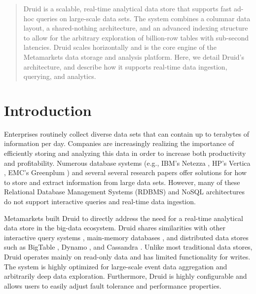 \documentclass{vldb}
\begin{document}
\maketitle

\begin{abstract}
Druid is a scalable, real-time analytical data store that supports
fast ad-hoc queries on large-scale data sets. The system combines a
columnar data layout, a shared-nothing architecture, and an advanced
indexing structure to allow for the arbitrary exploration of billion-row
tables with sub-second latencies. Druid scales horizontally and is the
core engine of the Metamarkets data storage and analysis platform. Here, we detail Druid's 
architecture, and describe how it supports real-time data ingestion, querying, and analytics. 
\end{abstract}

\section{Introduction}
Enterprises routinely collect diverse data sets that can contain up to terabytes of information per day. Companies are increasingly realizing the importance of efficiently storing and analyzing this data in order to increase both productivity and profitability. Numerous database systems (e.g., IBM’s Netezza \cite{singh2011introduction}, HP's Vertica \cite{bear2012vertica}, EMC’s Greenplum \cite{miner2012unified}) and several several research papers \cite{barroso2009datacenter, chaudhuri1997overview, dewitt1992parallel} offer solutions for how to store and extract information from large data sets. However, many of these Relational Database Management Systems (RDBMS) and NoSQL architectures do not support interactive queries and real-time data ingestion.

Metamarkets built Druid to directly address the need for a real-time analytical data store in the big-data ecosystem. Druid shares similarities with other interactive query systems \cite{melnik2010dremel}, main-memory databases \cite{farber2012sap}, and distributed data stores such as BigTable \cite{chang2008bigtable}, Dynamo \cite{decandia2007dynamo}, and Cassandra \cite{lakshman2010cassandra}. Unlike most traditional data stores, Druid operates mainly on read-only data and has limited functionality for writes. The system is highly optimized for large-scale event data aggregation and arbitrarily deep data exploration. Furthermore, Druid is highly configurable and allows users to easily adjust fault tolerance and performance properties.
\end{document}

